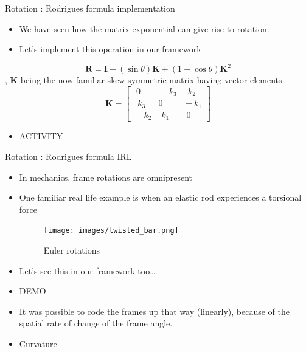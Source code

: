 \documentclass[presentation]{beamer}
\newcommand{\bv}[1]{\ensuremath{\mathbf{#1}}}
\begin{document}
\begin{frame}[label={sec:org3bcb996}]{Rotation : Rodrigues formula implementation}
\begin{itemize}
\item We have seen how the matrix exponential can give rise to rotation.
\item Let's implement this operation in our framework
\end{itemize}
\[ \mathbf {R} =\mathbf {I} +(\sin \theta )\mathbf {K} +(1-\cos \theta )\mathbf {K} ^{2} \]
, \(\bv{K}\) being the now-familiar skew-symmetric matrix having vector elements
\[ \mathbf {K} = \begin{bmatrix}\,\,0&\!-k_{3}&\,\,\,k_{2}\\\,\,\,k_{3}&0&\!-k_{1}\\\!-k_{2}&\,\,k_{1}&\,\,0\end{bmatrix}
   \]
\begin{itemize}
\item \alert{ACTIVITY}
\end{itemize}
\end{frame}
\begin{frame}[label={sec:orgdf4fb09}]{Rotation : Rodrigues formula IRL}
\begin{itemize}
\item In mechanics, frame rotations are omnipresent
\item One familiar real life example is when an elastic rod experiences a
torsional force
\begin{figure}[htbp]
\centering
\texttt{[image: images/twisted\_bar.png]}
\caption{Euler rotations}
\end{figure}
\item Let's see this in our framework too\ldots{}
\item \alert{DEMO}
\item It was possible to code the frames up that way (linearly), because of the
spatial rate of change of the frame angle.
\item \alert{Curvature}
\end{itemize}
\end{frame}
\end{document}
